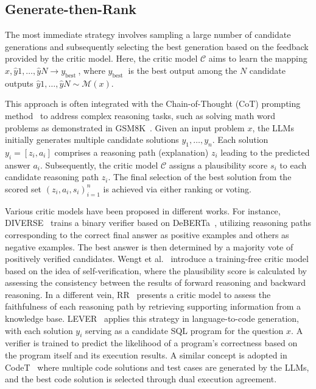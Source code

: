 \documentclass[a4paper,oneside]{book}
\begin{document}
\subsection{Generate-then-Rank}
The most immediate strategy involves sampling a large number of candidate generations and subsequently selecting the best generation based on the feedback provided by the critic model. Here, the critic model $\mathcal{C}$ aims to learn the mapping $x, \hat{y}{1}, \ldots, \hat{y}{N} \rightarrow y_{\text {best }}$, where $y_{\text {best }}$ is the best output among the $N$ candidate outputs $\hat{y}{1}, \ldots, \hat{y}{N} \sim \mathcal{M}(x)$.

This approach is often integrated with the Chain-of-Thought (CoT) prompting method~\cite{wei2023chainofthought} to address complex reasoning tasks, such as solving math word problems as demonstrated in GSM8K~\cite{cobbe2021training}. Given an input problem $x$, the LLMs initially generates multiple candidate solutions $y_{1}, \ldots, y_{n}$. Each solution $y_{i}=\left[z_{i}, a_{i}\right]$ comprises a reasoning path (explanation) $z_{i}$ leading to the predicted answer $a_{i}$. Subsequently, the critic model $\mathcal{C}$ assigns a plausibility score $s_{i}$ to each candidate reasoning path $z_{i}$. The final selection of the best solution from the scored set $\left(z_{i}, a_{i}, s_{i}\right)_{i=1}^{n}$ is achieved via either ranking or voting.

Various critic models have been proposed in different works. For instance, DIVERSE~\cite{li-etal-2023-making} trains a binary verifier based on DeBERTa~\cite{he2021deberta}, utilizing reasoning paths corresponding to the correct final answer as positive examples and others as negative examples. The best answer is then determined by a majority vote of positively verified candidates. Wengt et al.~\cite{weng2023large} introduce a training-free critic model based on the idea of self-verification, where the plausibility score is calculated by assessing the consistency between the results of forward reasoning and backward reasoning. In a different vein, RR~\cite{he2022rethinking} presents a critic model to assess the faithfulness of each reasoning path by retrieving supporting information from a knowledge base. LEVER~\cite{ni2023lever} applies this strategy in language-to-code generation, with each solution $y_{i}$ serving as a candidate SQL program for the question $x$. A verifier is trained to predict the likelihood of a program's correctness based on the program itself and its execution results. A similar concept is adopted in CodeT~\cite{chen2022codet} where multiple code solutions and test cases are generated by the LLMs, and the best code solution is selected through dual execution agreement.
\end{document}
